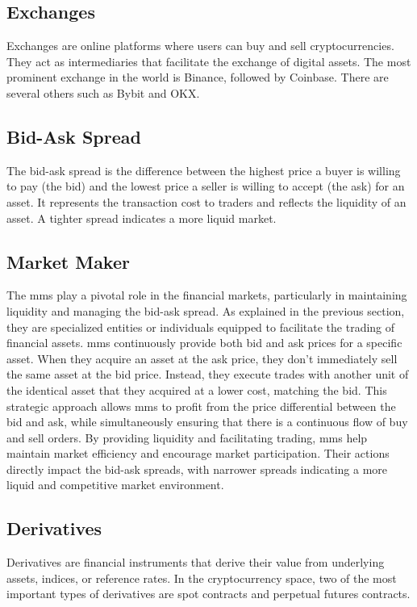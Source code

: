 \subsection{Exchanges}
\label{sub:Exchanges}
Exchanges are online platforms where users can buy and sell cryptocurrencies. They act as intermediaries that facilitate the exchange of digital assets. The most prominent exchange in the world is Binance, followed by Coinbase. There are several others such as Bybit and OKX.

\subsection{Bid-Ask Spread}
\label{sub:Bid-Ask}
The bid-ask spread is the difference between the highest price a buyer is willing to pay (the bid) and the lowest price a seller is willing to accept (the ask) for an asset. It represents the transaction cost to traders and reflects the liquidity of an asset. A tighter spread indicates a more liquid market.

\subsection{Market Maker}
\label{sub:MM}
The \glspl{mm} play a pivotal role in the financial markets, particularly in maintaining liquidity and managing the bid-ask spread. As explained in the previous section, they are specialized entities or individuals equipped to facilitate the trading of financial assets.
\newline
\newline
\glspl{mm} continuously provide both bid and ask prices for a specific asset. When they acquire an asset at the ask price, they don't immediately sell the same asset at the bid price. Instead, they execute trades with another unit of the identical asset that they acquired at a lower cost, matching the bid. This strategic approach allows \glspl{mm} to profit from the price differential between the bid and ask, while simultaneously ensuring that there is a continuous flow of buy and sell orders.
\newline
\newline
By providing liquidity and facilitating trading, \glspl{mm} help maintain market efficiency and encourage market participation. Their actions directly impact the bid-ask spreads, with narrower spreads indicating a more liquid and competitive market environment.

\subsection{Derivatives}
\label{sub:Derivatives}
Derivatives are financial instruments that derive their value from underlying assets, indices, or reference rates. In the cryptocurrency space, two of the most important types of derivatives are spot contracts and perpetual futures contracts.


